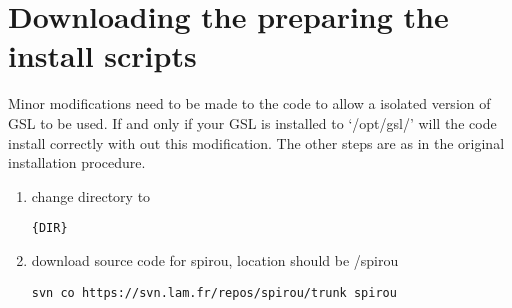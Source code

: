 \section{Downloading the preparing the install scripts}
\label{section:downloading_install_Scripts}

Minor modifications need to be made to the code to allow a isolated version of GSL to be used. If and only if your GSL is installed to `/opt/gsl/' will the code install correctly with out this modification. The other steps are as in the original installation procedure. \\

\begin{enumerate}
\item change directory to 
\begin{lstlisting}[style=bashstyle]
{DIR}
\end{lstlisting}

\item download source code for spirou, location should be /spirou
\begin{lstlisting}[style=bashstyle]
svn co https://svn.lam.fr/repos/spirou/trunk spirou
\end{lstlisting}

\end{enumerate}

